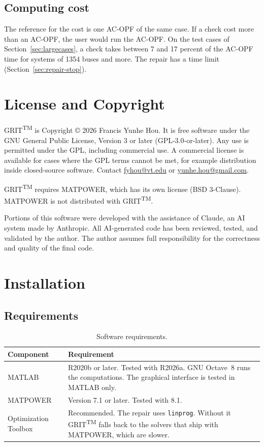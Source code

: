 \documentclass[a4paper,11pt]{article}
\newcommand{\TM}{\textsuperscript{TM}}
\newcommand{\GRIT}{GRIT\TM}
\begin{document}
\subsection{Computing cost}

The reference for the cost is one AC-OPF of the same case. If a check cost more than an AC-OPF, the user would run the AC-OPF. On the test cases of Section~\ref{sec:largecases}, a check takes between 7 and 17 percent of the AC-OPF time for systems of 1354 buses and more. The repair has a time limit (Section~\ref{sec:repair-stop}).

\section{License and Copyright}\label{sec:license}

\GRIT{} is Copyright \copyright{} 2026 Francis Yunhe Hou. It is free software under the GNU General Public License, Version 3 or later (GPL-3.0-or-later). Any use is permitted under the GPL, including commercial use. A commercial license is available for cases where the GPL terms cannot be met, for example distribution inside closed-source software. Contact \url{fyhou@vt.edu} or \url{yunhe.hou@gmail.com}.

\GRIT{} requires MATPOWER, which has its own license (BSD 3-Clause). MATPOWER is not distributed with \GRIT.

Portions of this software were developed with the assistance of Claude, an AI system made by Anthropic. All AI-generated code has been reviewed, tested, and validated by the author. The author assumes full responsibility for the correctness and quality of the final code.

\section{Installation}\label{sec:install}

\subsection{Requirements}

\begin{table}[H]\centering
\begin{tabular}{@{}lp{11cm}@{}}
\toprule
\textbf{Component} & \textbf{Requirement} \\
\midrule
MATLAB & R2020b or later. Tested with R2026a. GNU Octave~8 runs the computations. The graphical interface is tested in MATLAB only. \\
MATPOWER & Version 7.1 or later. Tested with 8.1. \\
Optimization Toolbox & Recommended. The repair uses \texttt{linprog}. Without it \GRIT{} falls back to the solvers that ship with MATPOWER, which are slower. \\
\bottomrule
\end{tabular}
\caption{Software requirements.}
\end{table}
\end{document}
